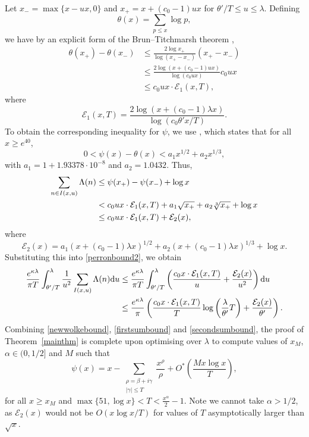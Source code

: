 \documentclass[reqno]{amsart}
\numberwithin{equation}{section}
\theoremstyle{remark}
\begin{document}
Let $x_-=\max\{x-ux,0\}$ and $x_+ = x+(c_0-1)ux$ for $\theta'/T\leq u\leq \lambda$. Defining 
\begin{equation*}
    \theta(x)=\sum_{p\leq x}\log p,
\end{equation*}
we have by an explicit form of the Brun--Titchmarsh theorem \cite[Theorem 2]{montgomery1973large},
\begin{align*}
    \theta(x_+)-\theta(x_-)&\leq \frac{2 \log x_+}{\log(x_+-x_-)}(x_+-x_-) \\
    &\leq \frac{2 \log( x+(c_0-1)ux)}{\log(c_0 ux)}c_0ux \\
    &\leq c_0 ux\cdot\mathcal{E}_1(x,T),
\end{align*}
where
\begin{equation*}
    \mathcal{E}_1(x,T)=\frac{2 \log( x+(c_0-1)\lambda x)}{\log(c_0 \theta'x/T)}.
\end{equation*}
To obtain the corresponding inequality for $\psi$, we use \cite[Corollary 5.1]{BKLNW_21}, which states that for all $x\geq e^{40}$,
\begin{equation*}
    0<\psi(x)-\theta(x)<a_1x^{1/2}+a_2x^{1/3},
\end{equation*}
with $a_1=1+1.93378\cdot 10^{-8}$ and $a_2=1.0432$. Thus,
\begin{align*}
    \sum_{n\in I(x,u)}\Lambda(n)&\leq \psi(x_+)-\psi(x_-) +\log x\notag\\
    &<c_0ux\cdot \mathcal{E}_1(x,T)+a_1\sqrt{x_+}+a_2\sqrt[3]{x_+}+\log x\\
    &\leq c_0ux\cdot\mathcal{E}_1(x,T)+\mathcal{E}_2(x),
\end{align*}
where
\begin{equation*}
    \mathcal{E}_2(x) = a_1(x+(c_0-1)\lambda x)^{1/2} + a_2(x+(c_0-1)\lambda x)^{1/3} + \log x.
\end{equation*}
Substituting this into \eqref{perronbound2}, we obtain
\begin{align}\label{secondsumbound}
    \frac{e^{\kappa\lambda}}{\pi T}\int^{\lambda}_{\theta'/T}\frac{1}{u^2}\sum_{I(x,u)}\Lambda(n)\mathrm{d}u &\leq \frac{e^{\kappa\lambda}}{\pi T}\int_{\theta'/T}^{\lambda}\left(\frac{c_0 x\cdot \mathcal{E}_1(x,T)}{u}+\frac{\mathcal{E}_2(x)}{u^2}\right)\mathrm{d}u\notag\\
    &\leq\frac{e^{\kappa\lambda}}{\pi}\left(\frac{c_0 x\cdot \mathcal{E}_1(x,T)}{T}\log\left(\frac{\lambda}{\theta'}T\right)+\frac{\mathcal{E}_2(x)}{\theta'}\right).
\end{align}
Combining \eqref{newwolkebound}, \eqref{firstsumbound} and \eqref{secondsumbound}, the proof of Theorem~\ref{mainthm} is complete upon optimising over $\lambda$ to compute values of $x_M$, $\alpha\in(0,1/2]$ and $M$ such that
\begin{equation*}
    \psi(x)=x-\sum_{\substack{\rho=\beta+i\gamma\\|\gamma|\leq T}}\frac{x^\rho}{\rho}+O^*\left(\frac{Mx\log x}{T}\right),
\end{equation*}
for all $x\geq x_M$ and $\max\{51,\log x\}<T<\frac{x^{\alpha}}{2}-1$. Note we cannot take $\alpha>1/2$, as $\mathcal{E}_2(x)$ would not be $O\left(x\log x/T\right)$ for values of $T$ asymptotically larger than $\sqrt{x}$.
\end{document}
